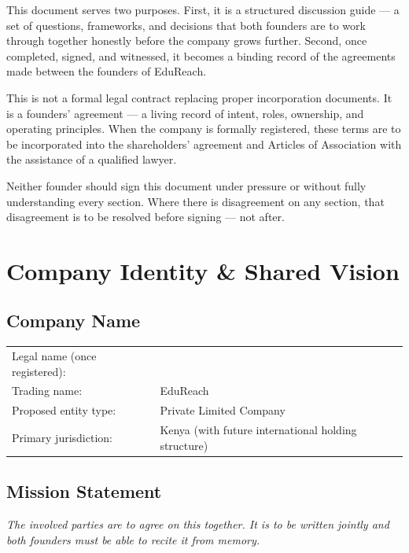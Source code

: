 \documentclass[12pt,a4paper]{article}
\newcommand{\blank}[1][5.5cm]{\underline{\hspace{#1}}}
\begin{document}
This document serves two purposes. First, it is a structured discussion guide --- a set of questions, frameworks, and decisions that both founders are to work through together honestly before the company grows further. Second, once completed, signed, and witnessed, it becomes a binding record of the agreements made between the founders of EduReach.

This is not a formal legal contract replacing proper incorporation documents. It is a founders' agreement --- a living record of intent, roles, ownership, and operating principles. When the company is formally registered, these terms are to be incorporated into the shareholders' agreement and Articles of Association with the assistance of a qualified lawyer.

Neither founder should sign this document under pressure or without fully understanding every section. Where there is disagreement on any section, that disagreement is to be resolved before signing --- not after.

\section{Company Identity \& Shared Vision}

\subsection{Company Name}

\begin{tabular}{@{}l l@{}}
  Legal name (once registered): & \blank \\[0.5em]
  Trading name:                  & EduReach \\[0.5em]
  Proposed entity type:          & Private Limited Company \\[0.5em]
  Primary jurisdiction:          & Kenya (with future international holding structure) \\
\end{tabular}

\subsection{Mission Statement}

\begin{notebox}
\textit{The involved parties are to agree on this together. It is to be written jointly and both founders must be able to recite it from memory.}
\end{notebox}
\end{document}
